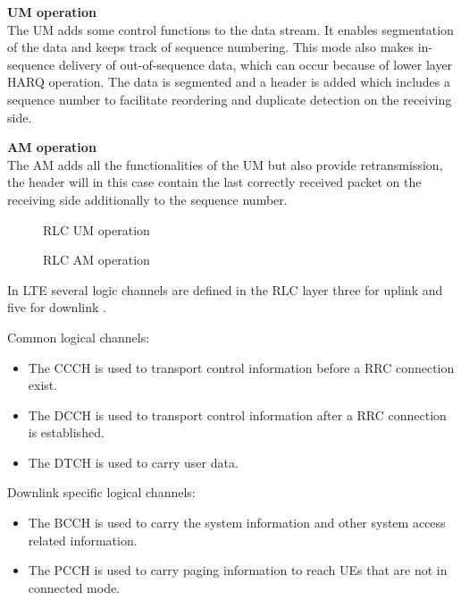 \textbf{\gls{UM} operation} \\
The \gls{UM} adds some control functions to the data stream. It enables segmentation of the data and keeps track of sequence numbering. This mode also makes in-sequence delivery of out-of-sequence data, which can occur because of lower layer \gls{HARQ} operation. The data is segmented and a header is added which includes a sequence number to facilitate reordering and duplicate detection on the receiving side.

\textbf{\gls{AM} operation} \\
The \gls{AM} adds all the functionalities of the \gls{UM} but also provide retransmission, the header will in this case contain the last correctly received packet on the receiving side additionally to the sequence number. 

\captionsetup{belowskip=0em}
\begin{minipage}[H]{0.48\textwidth}
\begin{figure}[H]
\centering
\resizebox{\textwidth}{!}{
}
\caption{\gls{RLC} \gls{UM} operation \citep[ch. 6.4]{book_LTE_for_UMTS}}
\label{fig:RLC_AM/UM_operation2}
\end{figure}
\end{minipage}
\begin{minipage}[H]{0.48\textwidth}
\begin{figure}[H]
\centering
\resizebox{\textwidth}{!}{
}
\caption{\gls{RLC} \gls{AM} operation \citep[ch. 6.4]{book_LTE_for_UMTS}}
\label{fig:RLC_AM/UM_operation}
\end{figure}
\end{minipage}
\captionsetup{belowskip=-1.5em}

In \gls{LTE} several logic channels are defined in the \gls{RLC} layer three for uplink and five for downlink \citep[ch. 6.3]{book_LTE_for_UMTS}. 

Common logical channels:
\begin{itemize}
\item The \gls{CCCH} is used to transport control information before a \gls{RRC} connection exist.  
\item The \gls{DCCH} is used to transport control information after a \gls{RRC} connection is established. 
\item The \gls{DTCH} is used to carry user data.
\end{itemize}
Downlink specific logical channels:
\begin{itemize}
\item The \gls{BCCH} is used to carry the system information and other system access related information.
\item The \gls{PCCH} is used to carry paging information to reach \gls{UE}s that are not in connected mode.
\end{itemize}

